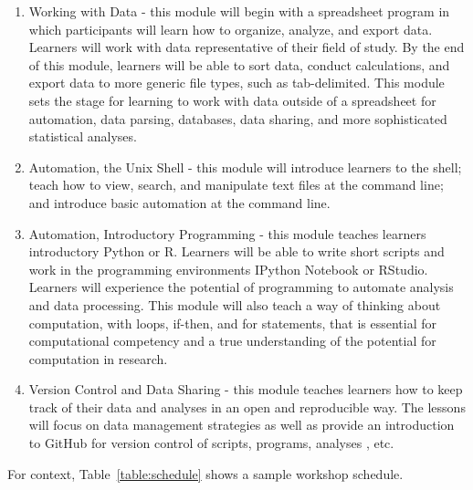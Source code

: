 \documentclass{proposalnsf}
\begin{document}
\begin{enumerate}

\item Working with Data - this module will begin with a spreadsheet program in which participants will learn how to organize, analyze, and export data.  Learners will work with data representative of their field of study.  By the end of this module, learners will be able to sort data, conduct calculations, and export data to more generic file types, such as tab-delimited.  This module sets the stage for learning to work with data outside of a spreadsheet for automation, data parsing, databases, data sharing, and more sophisticated statistical analyses.

\item Automation, the Unix Shell - this module will introduce learners to the shell; teach how to view, search, and manipulate text files at the command line; and introduce basic automation at the command line.

\item Automation, Introductory Programming - this module teaches learners 
  introductory Python or R.  Learners will be able to write short scripts and 
  work in the programming environments IPython Notebook or RStudio.  Learners will experience the potential of programming to automate analysis and data processing.  This module will also teach a way of thinking about computation, with loops, if-then, and for statements, that is essential for computational competency and a true understanding of the potential for computation in research.

\item Version Control and Data Sharing - this module teaches learners how to keep track of their data and analyses in an open and reproducible way.  The lessons will focus on data management strategies as well as provide an introduction to GitHub for version control of scripts, programs, analyses , etc.
\end{enumerate}
%
For context, Table~\ref{table:schedule} shows a sample workshop schedule.
\end{document}
